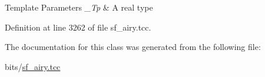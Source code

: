 \begin{DoxyTemplParams}{Template Parameters}
{\em \+\_\+\+Tp} & A real type \\
\hline
\end{DoxyTemplParams}


Definition at line 3262 of file sf\+\_\+airy.\+tcc.



The documentation for this class was generated from the following file\+:\begin{DoxyCompactItemize}
\item 
bits/\hyperlink{sf__airy_8tcc}{sf\+\_\+airy.\+tcc}\end{DoxyCompactItemize}
